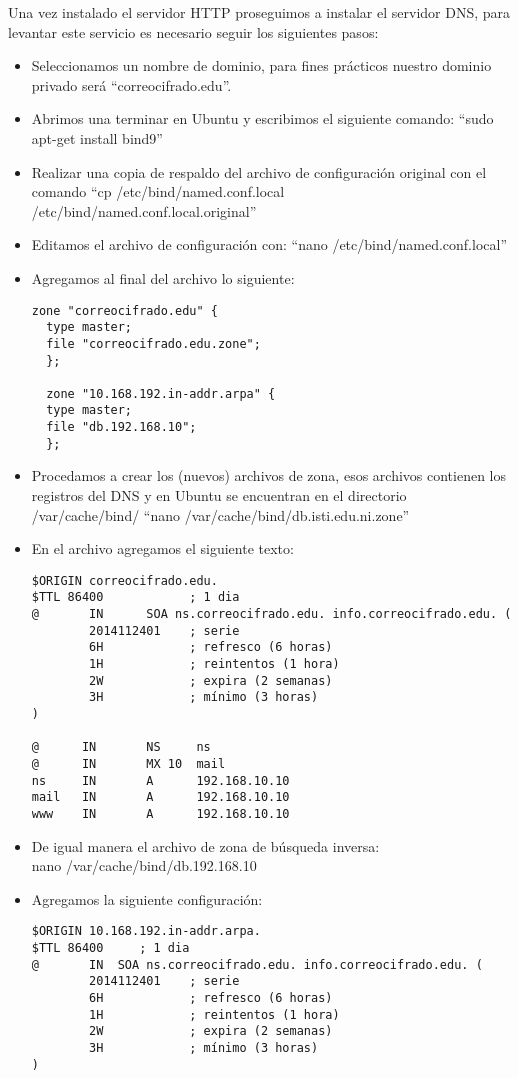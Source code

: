 \documentclass[12pt,oneside,onecolumn,openany]{report}
\begin{document}
Una vez instalado el servidor HTTP proseguimos a instalar el servidor DNS, para levantar este servicio es necesario seguir los siguientes pasos:
\begin{itemize}
 \item Seleccionamos un nombre de dominio, para fines prácticos nuestro dominio privado será “correocifrado.edu”.
 \item Abrimos una terminar en Ubuntu y escribimos el siguiente comando: “sudo apt-get install bind9”
 \item Realizar una copia de respaldo del archivo de configuración original con el comando “cp /etc/bind/named.conf.local \\ /etc/bind/named.conf.local.original”
 \item Editamos el archivo de configuración con: “nano /etc/bind/named.conf.local”
 \item Agregamos al final del archivo lo siguiente:
 \begin{lstlisting}[frame=single]
  zone "correocifrado.edu" {
  type master;
  file "correocifrado.edu.zone";
  };

  zone "10.168.192.in-addr.arpa" {
  type master;
  file "db.192.168.10";
  };
 \end{lstlisting}
 \item Procedamos a crear los (nuevos) archivos de zona, esos archivos contienen los registros del DNS y en Ubuntu se encuentran en el directorio /var/cache/bind/ “nano /var/cache/bind/db.isti.edu.ni.zone”
 \item En el archivo agregamos el siguiente texto:
 \begin{lstlisting}[frame=single]
  $ORIGIN correocifrado.edu.
$TTL 86400            ; 1 dia
@       IN      SOA ns.correocifrado.edu. info.correocifrado.edu. (
        2014112401    ; serie
        6H            ; refresco (6 horas)
        1H            ; reintentos (1 hora)
        2W            ; expira (2 semanas)
        3H            ; mínimo (3 horas)
)

@      IN       NS     ns
@      IN       MX 10  mail
ns     IN       A      192.168.10.10
mail   IN       A      192.168.10.10
www    IN       A      192.168.10.10
 \end{lstlisting}
 \item De igual manera el archivo de zona de búsqueda inversa:\\
  nano /var/cache/bind/db.192.168.10
  \item Agregamos la siguiente configuración:    
  \begin{lstlisting}[frame=single]
   $ORIGIN 10.168.192.in-addr.arpa.
$TTL 86400     ; 1 dia
@       IN  SOA ns.correocifrado.edu. info.correocifrado.edu. (
        2014112401    ; serie
        6H            ; refresco (6 horas)
        1H            ; reintentos (1 hora)
        2W            ; expira (2 semanas)
        3H            ; mínimo (3 horas)
)


\end{lstlisting}
\end{itemize}
\end{document}
